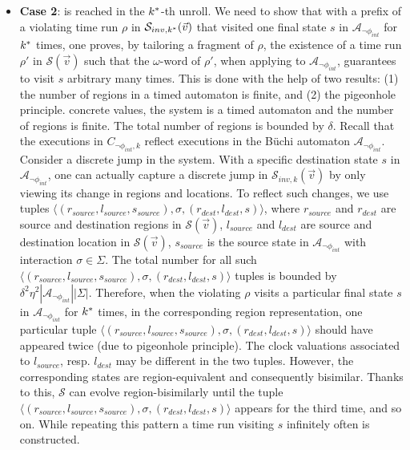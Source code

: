 \begin{itemize}
	\item \textbf{Case 2}:  is reached in the $k^*$-th
          unroll. We need to show that with a prefix of a violating
          time run $\rho$ in $\mathcal{S}_{inv,k^*}(\vec{v})$ that
          visited one final state $s$ in
          $\mathcal{A}_{\neg\phi_{int}}$ for $k^*$ times, one proves,
          by tailoring a fragment of $\rho$, the existence of a time
          run $\rho'$ in $\mathcal{S}(\vec{v})$ such that the
          $\omega$-word of $\rho'$, when applying to
          $\mathcal{A}_{\neg\phi_{int}}$, guarantees to visit $s$
          arbitrary many times.  This is done with the help of two results:
          (1) the number of regions in a timed automaton is finite,
          and (2) the pigeonhole principle.
concrete values, the system is a timed automaton and the
          number of regions is finite. The total number of regions is
          bounded by $\delta$. Recall that the executions in $C_{\neg
            \phi_{int},k}$ reflect executions in the B\"uchi automaton
          $\mathcal{A}_{\neg\phi_{int}}$. Consider a discrete jump in
          the system. With a specific destination state $s$ in
          $\mathcal{A}_{\neg\phi_{int}}$, one can actually capture a
          discrete jump in $\mathcal{S}_{inv,k}(\vec{v})$ by only
          viewing its change in regions and locations. To reflect such
          changes, we use tuples $\langle(r_{source}, l_{source},
          s_{source}),\sigma,(r_{dest}, l_{dest}, s)\rangle$, where
          $r_{source}$ and $r_{dest}$ are source and destination
          regions in $\mathcal{S}(\vec{v})$, $l_{source}$ and
          $l_{dest}$ are source and destination location in
          $\mathcal{S}(\vec{v})$, $s_{source}$ is the source state in
          $\mathcal{A}_{\neg\phi_{int}}$ with interaction $\sigma \in
          \Sigma$.  The total number for all such $\langle(r_{source},
          l_{source}, s_{source}),\sigma,(r_{dest}, l_{dest},
          s)\rangle$ tuples is bounded by $\delta^2 \eta^2
          |\mathcal{A}_{\neg\phi_{int}}| |\Sigma|$.  Therefore, when
          the violating $\rho$ visits a particular final state $s$ in
          $\mathcal{A}_{\neg\phi_{int}}$ for $k^*$ times, in the
          corresponding region representation, one particular tuple
          $\langle(r_{source}, l_{source},
          s_{source}),\sigma,(r_{dest}, l_{dest}, s)\rangle$ should
          have appeared twice (due to pigeonhole principle). The clock
          valuations associated to $l_{source}$, resp. $l_{dest}$ may
          be different in the two tuples. However, the corresponding
          states are region-equivalent and consequently
          bisimilar. Thanks to this, $\mathcal{S}$ can evolve
          region-bisimilarly until the tuple $\langle(r_{source},
          l_{source}, s_{source}),\sigma,(r_{dest}, l_{dest},
          s)\rangle$ appears for the third time, and so on. While
          repeating this pattern a time run visiting $s$ infinitely
          often is constructed.







\end{itemize}
